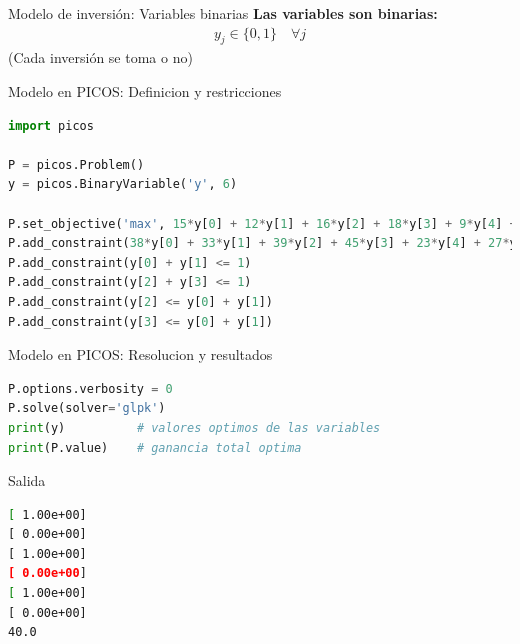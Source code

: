 \documentclass{beamer}
\begin{document}
\begin{frame}{Modelo de inversión: Variables binarias}
    \textbf{Las variables son binarias:}
    \begin{align*}
        y_j \in \{0,1\} \quad \forall j
    \end{align*}
    (Cada inversión se toma o no)
\end{frame}

\begin{frame}[fragile]{Modelo en PICOS: Definicion y restricciones}
    \begin{lstlisting}[language=Python]
import picos

P = picos.Problem()
y = picos.BinaryVariable('y', 6)

P.set_objective('max', 15*y[0] + 12*y[1] + 16*y[2] + 18*y[3] + 9*y[4] + 11*y[5])
P.add_constraint(38*y[0] + 33*y[1] + 39*y[2] + 45*y[3] + 23*y[4] + 27*y[5] <= 100)
P.add_constraint(y[0] + y[1] <= 1)
P.add_constraint(y[2] + y[3] <= 1)
P.add_constraint(y[2] <= y[0] + y[1])
P.add_constraint(y[3] <= y[0] + y[1])
    \end{lstlisting}
\end{frame}

\begin{frame}[fragile]{Modelo en PICOS: Resolucion y resultados}
    \begin{lstlisting}[language=Python]
P.options.verbosity = 0
P.solve(solver='glpk')
print(y)          # valores optimos de las variables
print(P.value)    # ganancia total optima
    \end{lstlisting}
\end{frame}

\begin{frame}[fragile]{Salida}
    \begin{lstlisting}[language=bash,backgroundcolor=\color{black},basicstyle=\color{white}\ttfamily,numbers=none]
[ 1.00e+00]
[ 0.00e+00]
[ 1.00e+00]
[ 0.00e+00]
[ 1.00e+00]
[ 0.00e+00]
40.0
    \end{lstlisting}
\end{frame}
\end{document}
